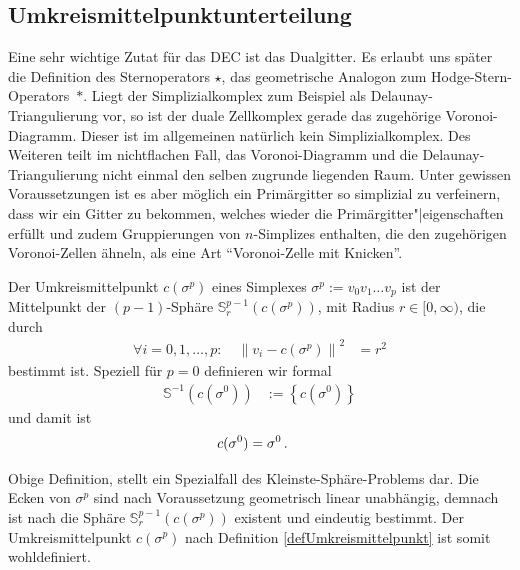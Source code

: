   \subsection{Umkreismittelpunktunterteilung}
    Eine sehr wichtige Zutat für das DEC ist das Dualgitter. 
    Es erlaubt uns später die Definition des Sternoperators \( \star \), das geometrische Analogon zum \mbox{Hodge-Stern-Operators \( * \)}.
    Liegt der Simplizialkomplex zum Beispiel als Delaunay-Triangulierung vor, so ist der duale Zellkomplex gerade das zugehörige Voronoi-Diagramm. 
    Dieser ist im allgemeinen natürlich kein Simplizialkomplex. Des Weiteren teilt im nichtflachen Fall, das Voronoi-Diagramm und die 
    Delaunay-Triangulierung nicht einmal den selben zugrunde
    liegenden Raum.
    Unter gewissen Voraussetzungen ist es aber möglich ein Primärgitter so simplizial zu verfeinern, dass wir ein Gitter zu bekommen, 
    welches wieder die Primärgitter"|eigenschaften erfüllt und
    zudem Gruppierungen von \( n \)-Simplizes enthalten, die den zugehörigen Voronoi-Zellen ähneln, als eine Art "`Voronoi-Zelle mit Knicken"'.

    \begin{definition}
      \label{defUmkreismittelpunkt}
      Der Umkreismittelpunkt \( c(\sigma^{p}) \) eines Simplexes \( \sigma^{p} := v_{0}v_{1} \ldots v_{p} \) ist der Mittelpunkt der \( (p-1) \)-Sphäre \( \mathds{S}_{r}^{p-1}(c(\sigma^{p})) \),
      mit Radius \( r\in [0,\infty) \), die durch
      \begin{align}
        \label{formSphere}
        \forall i = 0,1, \ldots, p:\quad \left\| v_{i} - c(\sigma^{p}) \right\|^{2} &= r^{2} 
      \end{align}
      bestimmt ist. Speziell für \( p = 0 \) definieren wir formal
      \begin{align}
        \mathds{S}^{-1}(c(\sigma^{0})) &:= \left\{ c(\sigma^{0}) \right\}
      \end{align}
      und damit ist
      \begin{align}
        c(\sigma^{0}) &= \sigma^{0} \,\text{.}
      \end{align}
    \end{definition}

    \begin{bemerkung}
      Obige Definition, stellt ein Spezialfall des Kleinste-Sphäre-Problems dar.
      Die Ecken von \( \sigma^{p} \) sind nach Voraussetzung geometrisch linear unabhängig, demnach ist nach \cite{converingSphere}  die Sphäre \( \mathds{S}_{r}^{p-1}(c(\sigma^{p})) \) existent
      und eindeutig bestimmt. Der Umkreismittelpunkt \( c(\sigma^{p}) \) nach Definition \ref{defUmkreismittelpunkt} ist somit wohldefiniert.
    \end{bemerkung}

